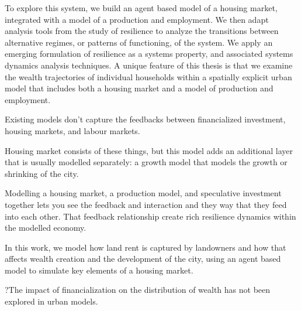 To explore this system, we build an agent based model of a housing market, integrated with a model of a production and employment. We then adapt analysis tools from the study of resilience to analyze the transitions between alternative regimes, or patterns of functioning, of the system. We apply an emerging formulation of resilience as a systems property, and associated systems dynamics analysis techniques. A unique feature of this thesis is that we examine the wealth trajectories of individual households within a spatially explicit urban model that includes both a housing market and a model of production and employment. 



Existing models don't capture the feedbacks between financialized investment, housing markets, and labour markets. 

Housing market consists of these things, but this model adds an additional layer that is usually modelled separately: a growth model that models the growth or shrinking of the city. 

Modelling a housing market, a production model, and speculative investment together lets you see the feedback and interaction and they way that they feed into each other. That feedback relationship create rich resilience dynamics within the modelled economy. 

In this work, we model how land rent is captured by landowners and how that affects wealth creation and the development of the city, using an agent based model to simulate key elements of a housing market. 

?The impact of financialization on the distribution of wealth has not been explored in urban models.

